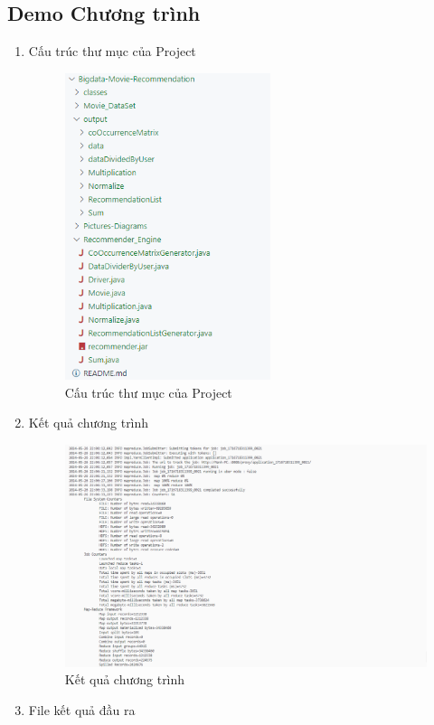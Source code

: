 \subsection*{Demo Chương trình}
\begin{enumerate}
    \item Cấu trúc thư mục của Project
          \begin{figure}[h]
              \centering
              \includegraphics[width=6cm]{images/Demo2.png}
              \caption{Cấu trúc thư mục của Project}
          \end{figure}
          \pagebreak
    \item Kết quả chương trình
          \begin{figure}[ht]
              \centering
              \includegraphics[width=15cm]{images/Demo3.png}
              \caption{Kết quả chương trình}
          \end{figure}
    \item File kết quả đầu ra

\end{enumerate}
